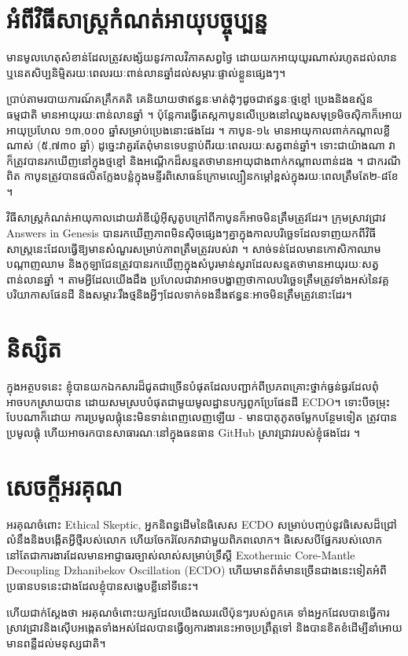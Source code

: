 \documentclass[10pt,twocolumn,letterpaper]{article}
\begin{document}
\section{អំពីវិធីសាស្ត្រកំណត់អាយុបច្ចុប្បន្ន}

មានមូលហេតុសំខាន់ដែលត្រូវសង្ស័យនូវកាលវិភាគសព្វថ្ងៃ ដោយយកអាយុយូរណាស់រហូតដល់លាន ឬនេតសិប្បនិម្មិតរយៈពេលរយៈពាន់លានឆ្នាំដល់សម្ភារៈផ្ទាល់ខ្លួនផ្សេងៗ។

ប្រាប់តាមរបាយការណ៍គគ្រឹកគតិ គេនិយាយថាឥន្ធនៈមាត់ដុំៗដូចជាឥន្ធនៈថ្មខ្មៅ ប្រេងនិងឧស្ម័នធម្មជាតិ មានអាយុរយៈពាន់លានឆ្នាំ \cite{104}។ ប៉ុន្តែការធ្វើតេស្តកាបូនលើប្រេងនៅឈូងសមុទ្រមិចស៊ិកាក៏អោយអាយុប្រហែល ១៣,០០០ ឆ្នាំសម្រាប់ប្រេងនោះផងដែរ \cite{105}។ កាបូន-១៤ មានអាយុកាលពាក់កណ្តាលខ្លីណាស់ (៥,៧៣០ ឆ្នាំ) ដូច្នេះវាគួរតែពុំមានទេបន្ទាប់ពីរយៈពេលរយៈសត្វពាន់ឆ្នាំ។ ទោះជាយ៉ាងណា វាក៏ត្រូវបានរកឃើញនៅក្នុងថ្មខ្មៅ និងអណ្តើកដ៏សន្មតថាមានអាយុជាងពាក់កណ្តាលពាន់ដង \cite{106}។ ជាករណីពិត កាបូនត្រូវបានផលិតក្លែងបន្លំក្នុងមន្ទីរពិសោធន៍ក្រោមល្បឿនកម្ដៅខ្ពស់ក្នុងរយៈពេលត្រឹមតែ២-៨ខែ \cite{107}។

វិធីសាស្ត្រកំណត់អាយុកាលដោយរ៉ាឌីយ៉ូអ៊ីសូតូបក្រៅពីកាបូនក៏អាចមិនត្រឹមត្រូវដែរ។ ក្រុមស្រាវជ្រាវ Answers in Genesis បានរកឃើញភាពមិនស៊ិចផ្សេងៗគ្នាក្នុងកាលបរិច្ឆេទដែលទាញយកពីវិធីសាស្ត្រនេះដែលធ្វើឱ្យមានសំណួរសម្រាប់ភាពត្រឹមត្រូវរបស់វា \cite{108}។ សាច់ទន់ដែលមានកោសិកាឈាម បណ្តាញឈាម និងកូឡាជែនត្រូវបានរកឃើញក្នុងសំបូរមាន់សូរាដែលសន្មតថាមានអាយុរយៈសត្វពាន់លានឆ្នាំ \cite{109,110}។ តាមអ្វីដែលយើងដឹង ប្រហែលជាវាអាចបង្ហាញថាកាលបរិច្ឆេទត្រឹមត្រូវទាំងអស់នៃវគ្គបរិយាកាសផែនដី និងសម្ភារៈរឹងថ្មនិងអ្វីៗដែលទាក់ទងនឹងឥន្ធនៈអាចមិនត្រឹមត្រូវនោះដែរ។ 

\section{និស្សិត}

ក្នុងអត្ថបទនេះ ខ្ញុំបានយកឯកសារដ៏ជូតជាច្រើនបំផុតដែលបញ្ជាក់ពីប្រភពគ្រោះថ្នាក់ធ្ងន់ធ្ងរដែលពុំអាចបកស្រាយបាន ដោយសមស្របបំផុតជាមួយមូលដ្ឋានបក្សពួកប្រែផែនដី ECDO។ ទោះបីចម្រុះបែបណាក៏ដោយ ការប្រមូលផ្ដុំនេះមិនទាន់ពេញលេញឡើយ - មានបាតុភូតចម្លែកបន្ថែមទៀត ត្រូវបានប្រមូលផ្ដុំ ហើយអាចរកបានសាធារណៈនៅក្នុងធនធាន GitHub ស្រាវជ្រាវរបស់ខ្ញុំផងដែរ \cite{2}។
\section{សេចក្ដីអរគុណ}

អរគុណចំពោះ Ethical Skeptic, អ្នកនិពន្ធដើមនៃធិសេស ECDO សម្រាប់បញ្ចប់នូវធិសេសដ៏ជ្រៅលំនឹងនិងបង្កើតអ្វីថ្មីរបស់លោក ហើយចែករំលែកវាជាមួយពិភពលោក។ ធិសេសបីផ្នែករបស់លោក \cite{1} នៅតែជាការងារដែលមានអាជ្ញាធរច្បាស់លាស់សម្រាប់ទ្រឹស្តី Exothermic Core-Mantle Decoupling Dzhanibekov Oscillation (ECDO) ហើយមានព័ត៌មានច្រើនជាងនេះទៀតអំពីប្រធានបទនេះជាងដែលខ្ញុំបានសង្ខេបខ្លីនៅទីនេះ។

ហើយជាក់ស្តែងថា អរគុណចំពោះយក្សដែលយើងឈរលើប៉ុនៗរបស់ពួកគេ ទាំង​អ្នក​ដែល​បានធ្វើការស្រាវជ្រាវ​និងស៊ើបអង្កេតទាំងអស់ដែលបានធ្វើឲ្យការងារនេះអាចប្រព្រឹត្តទៅ និងបានខិតខំដើម្បីនាំអោយមានពន្លឺដល់មនុស្សជាតិ។

\clearpage
\twocolumn

{\small
\renewcommand{\refname}{តំណាងអត្ថបទយោង}


}
\end{document}
